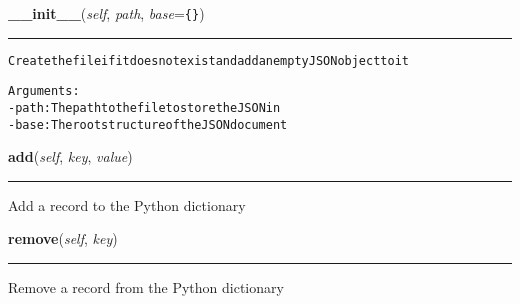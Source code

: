     \vspace{0.5ex}

\hspace{.8\funcindent}\begin{boxedminipage}{\funcwidth}

    \raggedright \textbf{\_\_init\_\_}(\textit{self}, \textit{path}, \textit{base}={\tt \texttt{\{}\texttt{\}}})

    \vspace{-1.5ex}

    \rule{\textwidth}{0.5\fboxrule}
\setlength{\parskip}{2ex}
\begin{alltt}

Create the file if it does not exist and add an empty JSON object to it

Arguments:
- path: The path to the file to store the JSON in
- base: The root structure of the JSON document
\end{alltt}

\setlength{\parskip}{1ex}
    \end{boxedminipage}

    \label{lib:pyjson:PyJson:add}

    \vspace{0.5ex}

\hspace{.8\funcindent}\begin{boxedminipage}{\funcwidth}

    \raggedright \textbf{add}(\textit{self}, \textit{key}, \textit{value})

    \vspace{-1.5ex}

    \rule{\textwidth}{0.5\fboxrule}
\setlength{\parskip}{2ex}
    Add a record to the Python dictionary

\setlength{\parskip}{1ex}
    \end{boxedminipage}

    \label{lib:pyjson:PyJson:remove}

    \vspace{0.5ex}

\hspace{.8\funcindent}\begin{boxedminipage}{\funcwidth}

    \raggedright \textbf{remove}(\textit{self}, \textit{key})

    \vspace{-1.5ex}

    \rule{\textwidth}{0.5\fboxrule}
\setlength{\parskip}{2ex}
    Remove a record from the Python dictionary

\setlength{\parskip}{1ex}
    \end{boxedminipage}

